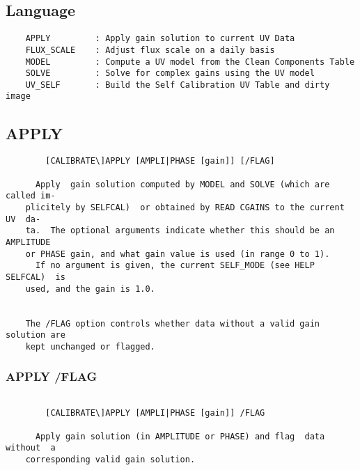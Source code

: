 \subsection{Language}
\begin{verbatim}
    APPLY         : Apply gain solution to current UV Data
    FLUX_SCALE    : Adjust flux scale on a daily basis
    MODEL         : Compute a UV model from the Clean Components Table
    SOLVE         : Solve for complex gains using the UV model
    UV_SELF       : Build the Self Calibration UV Table and dirty image

\end{verbatim}
\subsection{APPLY}
\begin{verbatim}
        [CALIBRATE\]APPLY [AMPLI|PHASE [gain]] [/FLAG]

      Apply  gain solution computed by MODEL and SOLVE (which are called im-
    plicitely by SELFCAL)  or obtained by READ CGAINS to the current UV  da-
    ta.  The optional arguments indicate whether this should be an AMPLITUDE
    or PHASE gain, and what gain value is used (in range 0 to 1).
      If no argument is given, the current SELF_MODE (see HELP  SELFCAL)  is
    used, and the gain is 1.0.


    The /FLAG option controls whether data without a valid gain solution are
    kept unchanged or flagged.

\end{verbatim}
\subsubsection{APPLY /FLAG}
\begin{verbatim}

        [CALIBRATE\]APPLY [AMPLI|PHASE [gain]] /FLAG

      Apply gain solution (in AMPLITUDE or PHASE) and flag  data  without  a
    corresponding valid gain solution.


\end{verbatim}
